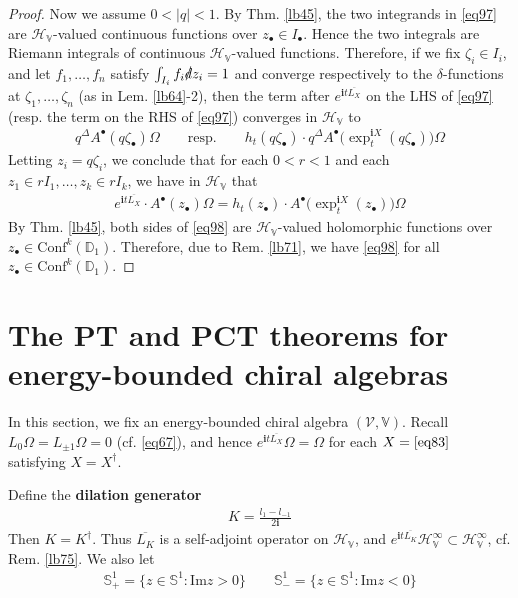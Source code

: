 \documentclass[12pt,b5paper,notitlepage]{article}
\theoremstyle{definition}
\theoremstyle{plain}
\newcommand{\mc}{\mathcal}
\newcommand{\ovl}{\overline}
\newcommand{\Conf}{\mathrm{Conf}}
\newcommand{\im}{\mathbf{i}}
\newcommand{\blt}{\bullet}
\newcommand{\Vbb}{\mathbb V}
\newcommand{\Dbb}{\mathbb D}
\newcommand{\Sbb}{{\mathbb S}}
\newcommand{\Imag}{\mathrm{Im}}
\newcommand{\HV}{\mathcal H_{\mathbb V}}
\newcommand{\sd}{\slashed{d}}
\numberwithin{equation}{section}
\begin{document}
\begin{proof}
Now we assume $0<|q|<1$. By Thm. \ref{lb45}, the two integrands in \eqref{eq97} are $\HV$-valued continuous functions over $z_\blt\in I_\blt$. Hence the two integrals are Riemann integrals of continuous $\HV$-valued functions. Therefore, if we fix $\zeta_i\in I_i$, and let $f_1,\dots,f_n$ satisfy $\int_{I_i}f_i\sd z_i=1$ and converge respectively to the $\delta$-functions at $\zeta_1,\dots,\zeta_n$ (as in Lem. \ref{lb64}-2), then the term after $e^{\im t\ovl{L_X}}$ on the LHS of \eqref{eq97} (resp. the term on the RHS of \eqref{eq97}) converges in $\HV$ to
\begin{align*}
q^\Delta A^\blt(q\zeta_\blt)\Omega\qquad\text{resp.}\qquad h_t(q\zeta_\blt)\cdot  q^\Delta A^\blt\big(\exp_t^{\im X}(q\zeta_\blt)\big)\Omega
\end{align*}
Letting $z_i=q\zeta_i$, we conclude that for each $0<r<1$ and each $z_1\in rI_1,\dots,z_k\in rI_k$, we have in $\HV$ that
\begin{align}\label{eq98}
e^{\im t\ovl{L_X}} \cdot A^\blt(z_\blt)\Omega=h_t(z_\blt)\cdot   A^\blt\big(\exp_t^{\im X}(z_\blt)\big)\Omega
\end{align} 
By Thm. \ref{lb45}, both sides of \eqref{eq98} are $\HV$-valued holomorphic functions over $z_\blt\in\Conf^k(\Dbb_1)$. Therefore, due to Rem. \ref{lb71}, we have \eqref{eq98} for all $z_\blt\in\Conf^k(\Dbb_1)$.
\end{proof}



\newpage



\section{The PT and PCT theorems for energy-bounded chiral algebras}



In this section, we fix an energy-bounded chiral algebra $(\mc V,\Vbb)$. Recall $L_0\Omega=L_{\pm 1}\Omega=0$ (cf. \eqref{eq67}), and hence $e^{\im t\ovl{L_X}}\Omega=\Omega$ for each $X=\eqref{eq83}$ satisfying $X=X^\dagger$.


Define the \textbf{dilation generator}  
\begin{align}\label{eq127}
K=\frac{l_1-l_{-1}}{2\im}
\end{align}
Then $K=K^\dagger$. Thus $\ovl{L_K}$ is a self-adjoint operator on $\HV$, and $e^{\im t\ovl{L_K}}\HV^\infty\subset\HV^\infty$, cf. Rem. \ref{lb75}. We also let \index{S@$\Sbb^1_+,\Sbb^1_-$}
\begin{align*}
\Sbb^1_+=\{z\in\Sbb^1:\Imag z>0\}\qquad \Sbb^1_-=\{z\in\Sbb^1:\Imag z<0\}
\end{align*}
\end{document}
